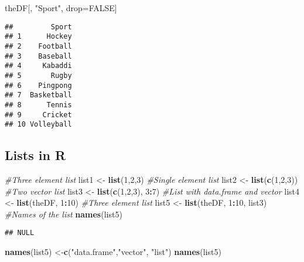 \documentclass[
]{article}
\newenvironment{Shaded}{\begin{snugshade}}{\end{snugshade}}
\newcommand{\CommentTok}[1]{\textcolor[rgb]{0.56,0.35,0.01}{\textit{#1}}}
\newcommand{\ConstantTok}[1]{\textcolor[rgb]{0.56,0.35,0.01}{#1}}
\newcommand{\DecValTok}[1]{\textcolor[rgb]{0.00,0.00,0.81}{#1}}
\newcommand{\FunctionTok}[1]{\textcolor[rgb]{0.13,0.29,0.53}{\textbf{#1}}}
\newcommand{\NormalTok}[1]{#1}
\newcommand{\OtherTok}[1]{\textcolor[rgb]{0.56,0.35,0.01}{#1}}
\newcommand{\SpecialCharTok}[1]{\textcolor[rgb]{0.81,0.36,0.00}{\textbf{#1}}}
\newcommand{\StringTok}[1]{\textcolor[rgb]{0.31,0.60,0.02}{#1}}
\begin{document}
\begin{Shaded}
\begin{Highlighting}[]
\NormalTok{theDF[, }\StringTok{"Sport"}\NormalTok{, drop}\OtherTok{=}\ConstantTok{FALSE}\NormalTok{]}
\end{Highlighting}
\end{Shaded}

\begin{verbatim}
##         Sport
## 1      Hockey
## 2    Football
## 3    Baseball
## 4     Kabaddi
## 5       Rugby
## 6    Pingpong
## 7  Basketball
## 8      Tennis
## 9     Cricket
## 10 Volleyball
\end{verbatim}

\subsection{Lists in R}\label{lists-in-r}

\begin{Shaded}
\begin{Highlighting}[]
\CommentTok{\#Three element list}
\NormalTok{list1 }\OtherTok{\textless{}{-}} \FunctionTok{list}\NormalTok{(}\DecValTok{1}\NormalTok{,}\DecValTok{2}\NormalTok{,}\DecValTok{3}\NormalTok{)}
\CommentTok{\#Single element list}
\NormalTok{list2 }\OtherTok{\textless{}{-}} \FunctionTok{list}\NormalTok{(}\FunctionTok{c}\NormalTok{(}\DecValTok{1}\NormalTok{,}\DecValTok{2}\NormalTok{,}\DecValTok{3}\NormalTok{))}
\CommentTok{\#Two vector list}
\NormalTok{list3 }\OtherTok{\textless{}{-}} \FunctionTok{list}\NormalTok{(}\FunctionTok{c}\NormalTok{(}\DecValTok{1}\NormalTok{,}\DecValTok{2}\NormalTok{,}\DecValTok{3}\NormalTok{), }\DecValTok{3}\SpecialCharTok{:}\DecValTok{7}\NormalTok{)}
\CommentTok{\#List with data.frame and vector}
\NormalTok{list4 }\OtherTok{\textless{}{-}} \FunctionTok{list}\NormalTok{(theDF, }\DecValTok{1}\SpecialCharTok{:}\DecValTok{10}\NormalTok{)}
\CommentTok{\#Three element list}
\NormalTok{list5 }\OtherTok{\textless{}{-}} \FunctionTok{list}\NormalTok{(theDF, }\DecValTok{1}\SpecialCharTok{:}\DecValTok{10}\NormalTok{, list3)}
\CommentTok{\#Names of the list}
\FunctionTok{names}\NormalTok{(list5)}
\end{Highlighting}
\end{Shaded}

\begin{verbatim}
## NULL
\end{verbatim}

\begin{Shaded}
\begin{Highlighting}[]
\FunctionTok{names}\NormalTok{(list5) }\OtherTok{\textless{}{-}}\FunctionTok{c}\NormalTok{(}\StringTok{"data.frame"}\NormalTok{,}\StringTok{"vector"}\NormalTok{, }\StringTok{"list"}\NormalTok{)}
\FunctionTok{names}\NormalTok{(list5)}
\end{Highlighting}
\end{Shaded}
\end{document}
